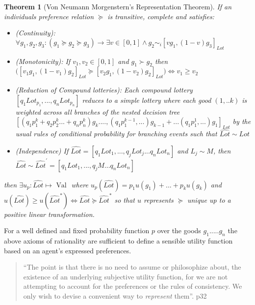 \documentclass[]{tufte-book}
\newtheorem{theorem}{Theorem}[chapter]
\theoremstyle{definition}
\theoremstyle{definition}
\theoremstyle{definition}
\theoremstyle{remark}
\begin{document}
\begin{theorem}[Von Neumann Morgenstern's Representation Theorem]
\protect\hypertarget{thm:unnamed-chunk-14}{}{\label{thm:unnamed-chunk-14} \iffalse (Von Neumann Morgenstern's Representation Theorem) \fi{} }If an individuals preference relation \(\succeq\) is transitive, complete and satisfies:

\begin{itemize}
\item
  (Continuity): \(\forall g_{1} , g_{2} , g_{3} : ( g_{1} \succeq g_{2} \succeq g_{3}) \rightarrow \exists v \in [0, 1] \wedge g_{2} \sim_{i} [v g_{1}, (1-v) g_{3}]_{Lot}\)
\item
  (Monotonicity): If \(v_{1}, v_{2} \in [0, 1]\) and \(g_{1} \succ g_{2}\) then \(\Big( [ v_{1} g_{1}, (1-v_{1})g_{2}]_{Lot} \succeq [ v_{2} g_{1}, (1-v_{2})g_{2}]_{Lot} \Big) \Leftrightarrow v_{1} \geq v_{2}\)
\item
  (Reduction of Compound lotteries): Each compound lottery \({[q_{1}Lot_{p_{1}}, ..., q_{n}Lot_{p_{n}}]}\) reduces to a simple lottery where each good \((1, .. k)\) is weighted across all branches of the nested decision tree \({[(q_{1}p^{k}_{1} + q_{2}p^{k}_{2} ... + q_{n}p^{k}_{n})g_{k} .... , (q_{1}p^{k-1}_{1} , ...)g_{k-1} + ... (q_{1}p^{1}_{1} , ...)g_{1}]_{Lot}}\) by the usual rules of conditional probability for branching events such that \(\widehat{Lot} \sim Lot\)
\item
  (Independence) If \(\widehat{Lot} = [q_{1}Lot_{1}, ..., q_{j}Lot_{j}...q_{n}Lot_{n}]\) and \(L_{j} \sim M\), then \(\widehat{Lot} \sim \widehat{Lot}^{'} = [q_{1}Lot_{1}, ..., q_{j}M...q_{n}Lot_{n}]\)
\end{itemize}

then \(\exists u_{p} :\widehat{Lot} \mapsto \text{ Val }\) where
\(u_{p}(\widehat{Lot}) = p_{1}u(g_{1}) + ... + p_{k}u(g_{k})\) and \(u(\widehat{Lot}) \geq u(\widehat{Lot}^{*}) \Leftrightarrow \widehat{Lot} \succeq \widehat{Lot}^{*}\) so that \(u\) represents \(\succeq\) unique up to a positive linear transformation.
\end{theorem}

For a well defined and fixed probability function \(p\) over the goods \(g_{1} ..... g_{n}\) the above axioms of rationality are sufficient to define a sensible utility function based on an agent's expressed preferences.

\begin{quote}
``The point is that there is no need to assume or philosophize about, the existence of an underlying subjective utility function, for we are not attempting to account for the preferences or the rules of consistency. We only wish to devise a convenient way to \emph{represent} them''. p32 \citep{luce1989games}
\end{quote}
\end{document}

